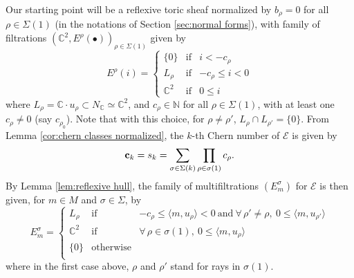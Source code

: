 \documentclass[a4paper,10pt]{amsart}
\theoremstyle{plain}{
    \newtheorem{theorem}{Theorem}[section]
    \newtheorem{lemma}[theorem]{Lemma}
    \newtheorem{corollary}[theorem]{Corollary}
    \newtheorem{proposition}[theorem]{Proposition}
    \newtheorem{conjecture}[theorem]{Conjecture}
}
\theoremstyle{definition}{
    \newtheorem{definition}[theorem]{Definition}
    \newtheorem{defn-thm}[theorem]{Definition-Theorem}
    \newtheorem{example}[theorem]{Example}
    \newtheorem{notation}[theorem]{Notation}
}
\theoremstyle{remark}{
    \newtheorem{remark}[theorem]{Remark}
    \newtheorem{problem}[theorem]{Problem}
    \newtheorem{question}[theorem]{Question}
}
\def\uc{{\bf c}}
\def\cE{\mathcal{E}}
\def\N{\mathbb{N}}
\def\C{\mathbb{C}}
\begin{document}
 Our starting point will be a reflexive toric sheaf normalized by $b_\rho=0$ for all $\rho\in\Sigma(1)$ (in the notations of Section \ref{sec:normal forms}), with family of filtrations $(\C^2,E^\rho(\bullet))_{\rho\in\Sigma(1)}$ given  by
 \begin{equation}
  \label{eq:starting sheaf}
 E^\rho(i)=\left\{
 \begin{array}{ccc}
                  \lbrace 0 \rbrace & \mathrm{ if } & i< -c_\rho \\
                 L_\rho & \mathrm{ if } & -c_\rho\leq i< 0 \\
\C^2 & \mathrm{ if } & 0\leq i 
                  \end{array}
                  \right.
 \end{equation}
 where $L_\rho=\C\cdot u_\rho\subset N_\C\simeq \C^2$, and $c_\rho\in\N$ for all $\rho\in\Sigma(1)$, with at least one $c_\rho\neq 0$ (say $c_{\rho_0}$). Note that with this choice, for $\rho\neq\rho'$, $L_\rho\cap L_{\rho'}=\lbrace 0 \rbrace$. From Lemma \ref{cor:chern classes normalized}, the $k$-th Chern number of $\cE$ is given by 
 $$\uc_k=s_k=\sum_{\sigma\in\Sigma(k)} \prod_{\rho\in\sigma(1)}c_\rho.$$
 By Lemma \ref{lem:reflexive hull}, the family of multifiltrations $(E^\sigma_m)$ for $\cE$ is then given, for $m\in M$ and $\sigma\in\Sigma$, by
\begin{equation}
  \label{eq:starting sheaf multifiltration}
 E^\sigma_m=\left\{
 \begin{array}{ccc}
                 L_\rho & \mathrm{ if } & -c_\rho\leq \langle m, u_\rho \rangle < 0\:\mathrm{ and }\: \forall\,\rho'\neq \rho, \: 0\leq \langle m, u_{\rho'} \rangle\\
\C^2 & \mathrm{ if } &\forall\, \rho\in\sigma(1),\: 0\leq  \langle m, u_\rho \rangle \\

                  \lbrace 0 \rbrace & \mathrm{ otherwise } & \\
                  \end{array}
                  \right.
 \end{equation}
where in the first case above, $\rho$ and $\rho'$ stand for rays in $\sigma(1)$.
\end{document}
